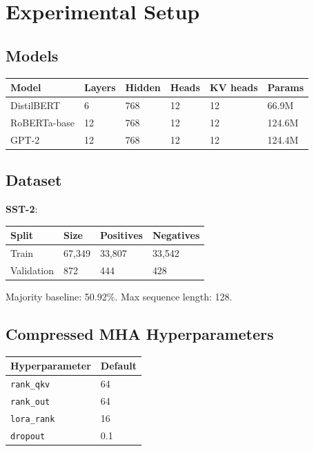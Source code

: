 \section{Experimental Setup}

\subsection{Models}

\begin{table}[H]
\centering
\small
\begin{tabular}{llllll}
\toprule
\textbf{Model} & \textbf{Layers} & \textbf{Hidden} & \textbf{Heads} & \textbf{KV heads} & \textbf{Params} \\
\midrule
DistilBERT & 6 & 768 & 12 & 12 & 66.9M \\
RoBERTa-base & 12 & 768 & 12 & 12 & 124.6M \\
GPT-2 & 12 & 768 & 12 & 12 & 124.4M \\
\bottomrule
\end{tabular}
\end{table}

\subsection{Dataset}

\textbf{SST-2}:

\begin{table}[H]
\centering
\small
\begin{tabular}{llll}
\toprule
\textbf{Split} & \textbf{Size} & \textbf{Positives} & \textbf{Negatives} \\
\midrule
Train & 67,349 & 33,807 & 33,542 \\
Validation & 872 & 444 & 428 \\
\bottomrule
\end{tabular}
\end{table}

Majority baseline: 50.92\%. Max sequence length: 128.

\subsection{Compressed MHA Hyperparameters}

\begin{table}[H]
\centering
\small
\begin{tabular}{ll}
\toprule
\textbf{Hyperparameter} & \textbf{Default} \\
\midrule
\texttt{rank\_qkv} & 64 \\
\texttt{rank\_out} & 64 \\
\texttt{lora\_rank} & 16 \\
\texttt{dropout} & 0.1 \\
\bottomrule
\end{tabular}
\end{table}

